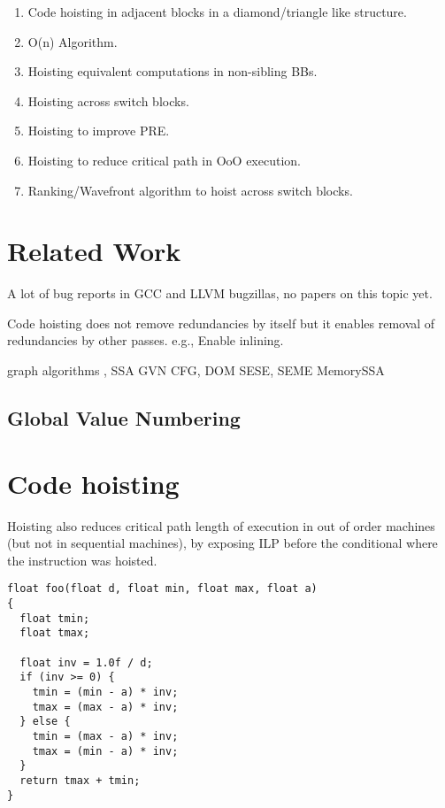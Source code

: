 \documentclass{sig-alternate}
\begin{document}
\begin{enumerate}
\item Code hoisting in adjacent blocks in a diamond/triangle like structure.
\item O(n) Algorithm.
\item Hoisting equivalent computations in non-sibling BBs.
\item Hoisting across switch blocks.
\item Hoisting to improve PRE.
\item Hoisting to reduce critical path in OoO execution.
\item Ranking/Wavefront algorithm to hoist across switch blocks.
\end{enumerate}

\section{Related Work}

A lot of bug reports in GCC and LLVM bugzillas, no papers on this topic yet.

Code hoisting does not remove redundancies by itself but it enables
removal of redundancies by other passes.  e.g., Enable inlining.


graph algorithms \cite{tarjan},
SSA \cite{cytron}
GVN \cite{rosen1988global,click1995global}
CFG, DOM \cite{dragonbook}
SESE, SEME \cite{sese}
MemorySSA \cite{novillo2007memory}

\subsection{Global Value Numbering}

\section{Code hoisting}
Hoisting also reduces critical path length of execution in out of
order machines (but not in sequential machines), by exposing ILP
before the conditional where the instruction was hoisted.

\begin{verbatim}
float foo(float d, float min, float max, float a)
{
  float tmin;
  float tmax;

  float inv = 1.0f / d;
  if (inv >= 0) {
    tmin = (min - a) * inv;
    tmax = (max - a) * inv;
  } else {
    tmin = (max - a) * inv;
    tmax = (min - a) * inv;
  }
  return tmax + tmin;
}
\end{verbatim}
\end{document}
